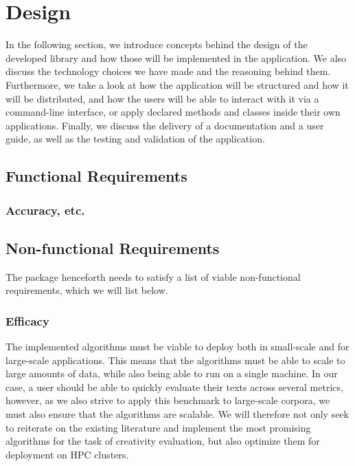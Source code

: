\chapter{Design}
\label{chap:design}

In the following section, we introduce concepts behind the design of the developed library and how those will be implemented in the application. We also discuss the technology choices we have made and the reasoning behind them. Furthermore, we take a look at how the application will be structured and how it will be distributed, and how the users will be able to interact with it via a command-line interface, or apply declared methods and classes inside their own applications. Finally, we discuss the delivery of a documentation and a user guide, as well as the testing and validation of the application.

\section{Functional Requirements}
\subsection{Accuracy, etc.}




\section{Non-functional Requirements}
The package henceforth needs to satisfy a list of viable non-functional requirements, which we will list below.
\subsection{Efficacy}
The implemented algorithms must be viable to deploy both in small-scale and for large-scale applications. This means that the algorithms must be able to scale to large amounts of data, while also being able to run on a single machine. In our case, a user should be able to quickly evaluate their texts across several metrics, however, as we also strive to apply this benchmark to large-scale corpora, we must also ensure that the algorithms are scalable.
We will therefore not only seek to reiterate on the existing literature and implement the most promising algorithms for the task of creativity evaluation, but also optimize them for deployment on HPC clusters. 
